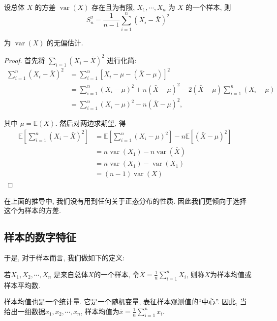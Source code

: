 \begin{theorem}
    设总体 $X$ 的方差 $\operatorname{var}(X)$ 存在且为有限, $X_1, \cdots, X_n$ 为 $X$ 的一个样本, 则
$$
S_n^2=\frac{1}{n-1} \sum_{i=1}^n\left(X_i-\bar{X}\right)^2
$$

为 $\operatorname{var}(X)$ 的无偏估计.
\end{theorem}

\begin{proof}
    首先将 $\sum_{i=1}\left(X_i-\bar{X}\right)^2$ 进行化简:
$$
\begin{aligned}
\sum_{i=1}^n\left(X_i-\bar{X}\right)^2&=\sum_{i=1}^n\left[X_i-\mu-(\bar{X}-\mu)\right]^2 & \\
& =\sum_{i=1}^n\left(X_i-\mu\right)^2+n(\bar{X}-\mu)^2-2(\bar{X}-\mu) \sum_{i=1}^n\left(X_i-\mu\right) \\
& =\sum_{i=1}^n\left(X_i-\mu\right)^2-n(\bar{X}-\mu)^2,
\end{aligned}
$$

其中 $\mu=\mathbb{E}(X)$. 然后对两边求期望, 得
$$
\begin{aligned}
\mathbb{E}\left[\sum_{i=1}^n\left(X_i-\bar{X}\right)^2\right]&=\mathbb{E}\left[\sum_{i=1}^n\left(X_i-\mu\right)^2\right]-n \mathbb{E}\left[(\bar{X}-\mu)^2\right] \\
&=n \operatorname{var}\left(X_1\right)-n \operatorname{var}(\bar{X})&\\
&=n \operatorname{var}\left(X_1\right)-\operatorname{var}\left(X_1\right) \\
&=(n-1) \operatorname{var}(X)
\end{aligned}
$$
\end{proof}

在上面的推导中, 我们没有用到任何关于正态分布的性质. 因此我们更倾向于选择这个为样本的方差. 

\subsection{样本的数字特征}

于是, 对于样本而言, 我们做如下的定义: 

\begin{definition}
    若$X_1, X_2, \cdots, X_n$ 是来自总体$X$的一个样本, 令$\bar X = \frac 1n \sum_{i=1}^{n}X_i$, 则称$\bar X$为样本均值或样本平均数. 
\end{definition}

样本均值也是一个统计量. 它是一个随机变量, 表征样本观测值的``中心''. 因此, 当给出一组数据$x_1, x_2, \cdots, x_n$, 样本均值为$\bar x=\frac 1n \sum_{i=1}^n x_i$.

